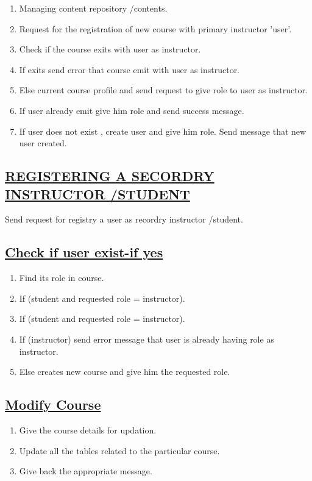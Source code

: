 \documentclass{article}
\begin{document}
\begin{enumerate}
\item Managing content repository /contents.
\item Request for the registration of new course with primary instructor 'user'.
\item Check if the course exits with user as instructor.
\item If exits send error that course emit with user as instructor.
\item Else current course profile and send request to give role to user as instructor.
\item If user already emit give him role and send success message.
\item If user does not exist , create user and give him role. Send message that new user created.
\end{enumerate}
\subsection*{\underline{REGISTERING A SECORDRY INSTRUCTOR /STUDENT}}
Send request for registry a user as recordry instructor /student.
\subsection*{\underline{Check if user exist-if yes}}
\begin{enumerate}
\item Find its role in course.
\item If (student and requested role = instructor).
\item If (student and requested role = instructor).
\item If (instructor) send error message that user is already having role as instructor.
\item Else creates new course and give him the requested role. 
\end{enumerate}
\subsection*{\underline{Modify Course}}
\begin{enumerate}
\item Give the course details for updation.
\item Update all the tables related to the particular course.
\item Give back the appropriate message.
\begin{center}

\end{center}
\end{enumerate}
\end{document}

